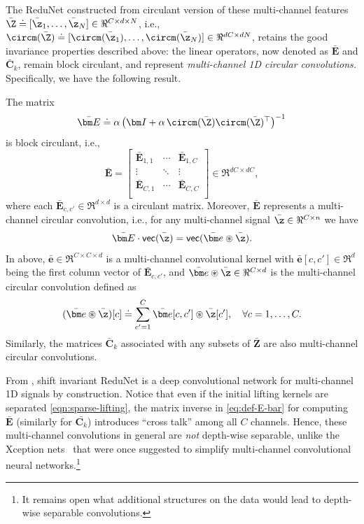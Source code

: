 \documentclass[../../book-main.tex]{subfiles}
\begin{document}
The ReduNet constructed from circulant version of these multi-channel features $\bar\Z \doteq [\bar \z_1, \ldots, \bar \z_N] \in \Re^{C \times d \times N}$, i.e., $\circm(\bar\Z) \doteq [ \circm(\bar\z_1), \dots, \circm(\bar\z_N)] \in \Re^{dC \times dN}$, retains the good invariance properties described above: the linear operators, now denoted as $\bar{\bm E}$ and $\bar{\bm C}_k$, remain block circulant, and represent {\em multi-channel 1D circular convolutions. }
Specifically, we have the following result.
\begin{proposition}
The matrix 
\begin{equation}
\label{eq:def-E-bar}
\bar{\bm E} \doteq \alpha\left(\bm I + \alpha\, \circm(\bar\Z) \circm(\bar\Z)^\top \right) ^{-1}  
\end{equation}
is block circulant, i.e.,
\begin{equation*}
    \bar{\bm E} = 
    \left[\begin{matrix}
        \bar{\bm E}_{1, 1} & \cdots & \bar{\bm E}_{1, C}\\
        \vdots & \ddots & \vdots \\
        \bar{\bm E}_{C, 1} & \cdots & \bar{\bm E}_{C, C}\\
    \end{matrix}\right] \in \Re^{dC \times dC},
\end{equation*}
where each $\bar{\bm E}_{c, c'}\in \Re^{d \times d}$ is a circulant matrix. Moreover, $\bar{\bm E}$ represents a multi-channel circular convolution, i.e., for any multi-channel signal $\bar\z \in \Re^{C \times n}$ we have 
$$\bar{\bm E} \cdot \textsf{vec}(\bar\z) = \textsf{vec}( \bar{\bm e} \circledast \bar\z).$$ 
In above, $\bar{\bm e} \in \Re^{C \times C \times d}$ is a multi-channel convolutional kernel with $\bar{\bm e}[c, c'] \in \Re^{d}$ being the first column vector of $\bar{\bm E}_{c, c'}$, and $\bar{\bm e} \circledast \bar\z \in \Re^{C \times d}$ is the multi-channel circular convolution defined as
\begin{equation*}
    (\bar{\bm e} \circledast \bar\z)[c] \doteq \sum_{c'=1}^C \bar{\bm e}[c, c'] \circledast \bar{\z}[c'], \quad \forall c = 1, \ldots, C.
\end{equation*}
Similarly, the matrices $\bar{\bm C}_k$ associated with any subsets of $\bar{\bm Z}$ are also multi-channel circular convolutions. 
\label{prop:multichannel-circular-conv-1}
\end{proposition}
From , shift invariant ReduNet is a deep convolutional network for multi-channel 1D signals by construction. Notice that even if the initial lifting kernels are separated \eqref{eqn:sparse-lifting}, the matrix inverse  in \eqref{eq:def-E-bar} for computing $\bar{\bm E}$ (similarly for $\bar{\bm C_k}$) introduces ``cross talk'' among all $C$ channels. %
Hence, these multi-channel convolutions in general are {\em not} depth-wise separable, unlike the  Xception nets~\cite{Xception} that were once suggested to simplify multi-channel convolutional neural networks.\footnote{It remains open what additional structures on the data would lead to depth-wise separable convolutions.} 
\end{document}
